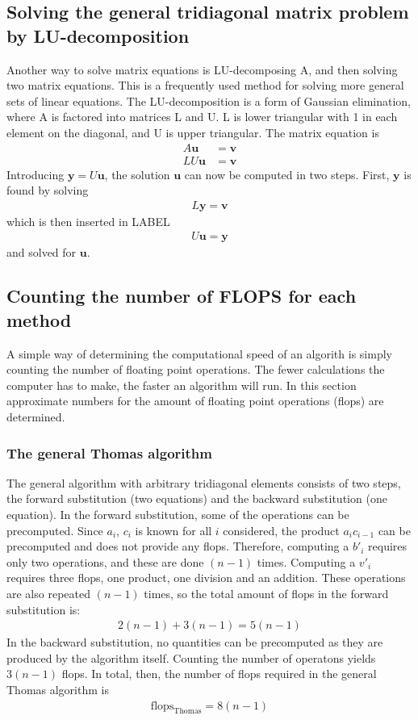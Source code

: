 \documentclass[aps,prl,reprint,toc]{revtex4-1}
\begin{document}
\subsection{Solving the general tridiagonal matrix problem by LU-decomposition}
Another way to solve matrix equations is LU-decomposing A, and then solving
two matrix equations. This is a frequently used method for solving more general
sets of linear equations. The LU-decomposition is a form of Gaussian elimination,
where A is factored into matrices L and U. L is lower triangular with 1 in each
element on the diagonal, and U is upper triangular. The matrix equation is
\begin{align*}
  A\mathbf{u} &= \mathbf{v} \\
  LU \mathbf{u} &= \mathbf{v}
\end{align*}
Introducing $\mathbf{y} = U\mathbf{u}$, the solution $\mathbf{u}$ can now be
computed in two steps. First, $\mathbf{y}$ is found by solving
\begin{align*}
  L\mathbf{y} = \mathbf{v}
\end{align*}
which is then inserted in LABEL
\begin{align*}
  U\mathbf{u} = \mathbf{y}
\end{align*}
and solved for $\mathbf{u}$.

\subsection{Counting the number of FLOPS for each method}
A simple way of determining the computational speed of an algorith is simply
counting the number of floating point operations. The fewer calculations the
computer has to make, the faster an algorithm will run. In this section approximate numbers
for the amount of floating point operations (flops) are determined.
\subsubsection{The general Thomas algorithm}
The general algorithm with arbitrary tridiagonal elements consists of two steps,
the forward substitution (two equations) and the backward substitution (one equation).
In the forward substitution, some of the operations can be precomputed. Since
$a_i$, $c_i$ is known for all $i$ considered, the product
$a_i c_{i-1}$ can be precomputed and does not provide any flops.
Therefore, computing a $b'_i$ requires only two operations, and
these are done $(n-1)$ times. Computing a $v'_i$ requires three flops, one
product, one division and an addition. These operations are also repeated $(n-1)$ times,
so the total amount of flops in the forward substitution is:
\begin{align*}
  2(n-1) + 3(n-1) = 5(n-1)
\end{align*}
In the backward substitution, no quantities can be precomputed as they are
produced by the algorithm itself. Counting the number of operatons yields $3(n-1)$ flops.
In total, then, the number of flops required in the general Thomas algorithm is
\begin{align*}
  \text{flops}_\text{Thomas} = 8(n-1)
\end{align*}
\end{document}
